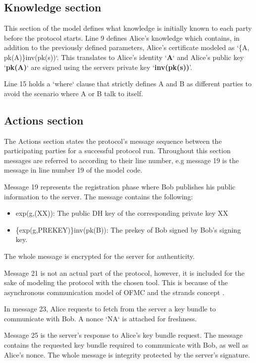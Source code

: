 \subsection{Knowledge section}
This section of the model defines what knowledge is initially known to each party before the protocol starts. Line 9 defines Alice's knowledge which contains, in addition to the previously defined parameters, Alice's certificate modeled as `\{A, pk(A)\}inv(pk(s))`. This translates to Alice's identity `\textbf{A}` and Alice's public key `\textbf{pk(A)}` are signed using the servers private key `\textbf{inv(pk(s))}'. 

Line 15 holds a `where` clause that strictly defines A and B as different parties to avoid the scenario where A or B talk to itself.
\subsection{Actions section}
The Actions section states the protocol's message sequence between the participating parties for a successful protocol run. Throughout this section messages are referred to according to their line number, e.g message 19 is the message in line number 19 of the model code.
\par
Message 19 represents the registration phase where Bob publishes his public information to the server. The message contains the following:
\begin{itemize}\setlength\itemsep{-0.3em}
	\item exp(g,(XX)): The public DH key of the corresponding private key XX
	\item \{exp(g,PREKEY)\}inv(pk(B)): The prekey of Bob signed by Bob's signing key.
\end{itemize}
The whole message is encrypted for the server for authenticity.
\par
Message 21 is not an actual part of the protocol, however, it is included for the sake of modeling the protocol with the chosen tool. This is because of the asynchronous communication model of OFMC and the strands concept \cite{ofmcTut}.
\par 
In message 23, Alice requests to fetch from the server a key bundle to communicate with Bob. A nonce `NA` is attached for freshness.
\par
Message 25 is the server's response to Alice's key bundle request. The message contains the requested key bundle required to communicate with Bob, as well as Alice's nonce. The whole message is integrity protected by the server's signature.
